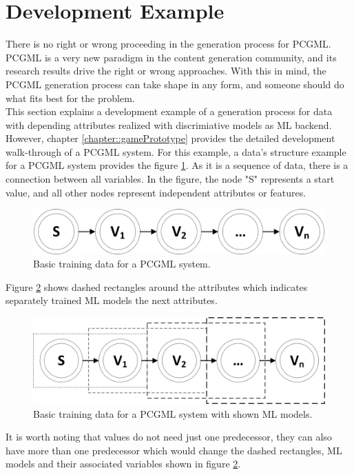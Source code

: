 \documentclass[MGS,Master,english]{twbook}%
\begin{document}
\section{Development Example}
There is no right or wrong proceeding in the generation process for PCGML. PCGML is a very new paradigm in the content generation community, and its research results drive the right or wrong approaches. With this in mind, the PCGML generation process can take shape in any form, and someone should do what fits best for the problem.\\
This section explains a development example of a generation process for data with depending attributes realized with discrimiative models as ML backend. However, chapter \ref{chapter::gamePrototype} provides the detailed development walk-through of a PCGML system. For this example, a data’s structure example for a PCGML system provides the figure \ref{fig::PCGML::devExample::sequenceBase}. As it is a sequence of data, there is a connection between all variables. In the figure, the node "S" represents a start value, and all other nodes represent independent attributes or features. 
\begin{figure}[!htbp]
	\centering
	\includegraphics[width=0.5\linewidth]{PICs/PCGML_development_example_sequence_base}
	\caption{Basic training data for a PCGML system. }\label{fig::PCGML::devExample::sequenceBase}
\end{figure}
Figure \ref{fig::PCGML::devExample::sequenceWithModels} shows dashed rectangles around the attributes which indicates separately trained ML models the next attributes. 
\begin{figure}[!htbp]
	\centering
	\includegraphics[width=0.55\linewidth]{PICs/PCGML_development_example_sequence_with_models}
	\caption{Basic training data for a PCGML system with shown ML models.}\label{fig::PCGML::devExample::sequenceWithModels}
\end{figure}
It is worth noting that values do not need just one predecessor, they can also have more than one predecessor which would change the dashed rectangles, ML models and their associated variables shown in figure \ref{fig::PCGML::devExample::sequenceWithModels}.
\end{document}
